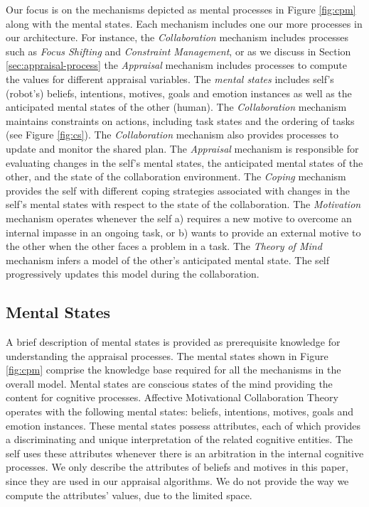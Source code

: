 \documentclass{aamas2016}
\begin{document}
Our focus is on the mechanisms depicted as mental processes in Figure
\ref{fig:cpm} along with the mental states. Each mechanism includes one our
more processes in our architecture. For instance, the \textit{Collaboration}
mechanism includes processes such as \textit{Focus Shifting} and
\textit{Constraint Management}, or as we discuss in Section
\ref{sec:appraisal-process} the \textit{Appraisal} mechanism includes processes
to compute the values for different appraisal variables. The \textit{mental
states} includes self's (robot's) beliefs, intentions, motives, goals and
emotion instances as well as the anticipated mental states of the other (human).
The \textit{Collaboration} mechanism maintains constraints on actions, including
task states and the ordering of tasks (see Figure \ref{fig:cs}). The
\textit{Collaboration} mechanism also provides processes to update and monitor
the shared plan. The \textit{Appraisal} mechanism is responsible for evaluating
changes in the self's mental states, the anticipated mental states of the other,
and the state of the collaboration environment. The \textit{Coping} mechanism
provides the self with different coping strategies associated with changes in
the self's mental states with respect to the state of the collaboration. The
\textit{Motivation} mechanism operates whenever the self a) requires a new
motive to overcome an internal impasse in an ongoing task, or b) wants to
provide an external motive to the other when the other faces a problem in a
task. The \textit{Theory of Mind} mechanism infers a model of the other's
anticipated mental state. The self progressively updates this model during the
collaboration.

\vspace*{-1mm}
\subsection{Mental States}
\label{sec:mental-states}

A brief description of mental states is provided as prerequisite knowledge for
understanding the appraisal processes. The mental states shown in Figure
\ref{fig:cpm} comprise the knowledge base required for all the mechanisms in the
overall model. Mental states are conscious states of the mind providing the
content for cognitive processes. Affective Motivational Collaboration Theory
operates with the following mental states: beliefs, intentions, motives, goals
and emotion instances. These mental states possess attributes, each of which
provides a discriminating and unique interpretation of the related cognitive
entities. The self uses these attributes whenever there is an arbitration in the
internal cognitive processes. We only describe the attributes of beliefs and
motives in this paper, since they are used in our appraisal algorithms. We do
not provide the way we compute the attributes' values, due to the limited space.
\end{document}
